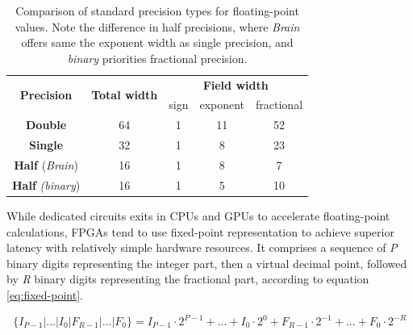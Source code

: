 \begin{table}[hpt!]
  \centering
  \caption{Comparison of standard precision types for floating-point values. Note the difference in half precisions, where \textit{Brain} offers same the exponent width as single precision, and \textit{binary} priorities fractional precision.}
  \label{tab:floating-point-widths}
  \begin{tabular}{|c|c|ccc|}
  \hline
  \multirow{2}{*}{\textbf{Precision}} & \multirow{2}{*}{\textbf{Total width}} & \multicolumn{3}{c|}{\textbf{Field width}}                                    \\ \cline{3-5} 
                                      &                                       & \multicolumn{1}{c|}{sign} & \multicolumn{1}{c|}{exponent} & fractional \\ \hline
  \textbf{Double}                     & 64                                    & \multicolumn{1}{c|}{1}    & \multicolumn{1}{c|}{11}       & 52         \\ \hline
  \textbf{Single}                     & 32                                    & \multicolumn{1}{c|}{1}    & \multicolumn{1}{c|}{8}        & 23         \\ \hline
  \textbf{Half} (\textit{Brain})               & 16                                    & \multicolumn{1}{c|}{1}    & \multicolumn{1}{c|}{8}        & 7          \\ \hline
  \textbf{Half} \textit{(binary})              & 16                                    & \multicolumn{1}{c|}{1}    & \multicolumn{1}{c|}{5}        & 10         \\ \hline
  \end{tabular}
\end{table}

While dedicated circuits exits in CPUs and GPUs to accelerate floating-point calculations, FPGAs tend to use fixed-point representation to achieve superior latency with relatively simple hardware resources. It comprises a sequence of \textit{P} binary digits representing the integer part, then a virtual decimal point, followed by \textit{R} binary digits representing the fractional part, according to equation \ref{eq:fixed-point}.

\begin{equation}\label{eq:fixed-point}
  \{ I_{P-1} | ... | I_0 | F_{R-1} | ... | F_0 \} = I_{P-1} \cdot 2^{P-1} + ... + I_{0} \cdot 2^{0} + F_{R-1} \cdot 2^{-1} + ... + F_{0} \cdot 2^{-R}
\end{equation}

